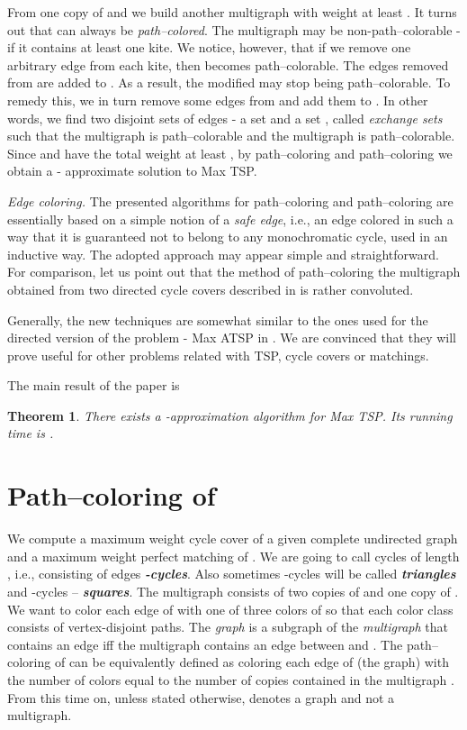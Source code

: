 \documentclass[a4, 11pt]{article}
\newcommand{\<}{\langle}
\renewcommand{\>}{\rangle}
\newtheorem{theorem}{Theorem}
\begin{document}
 From one copy of  and  we build another multigraph  with weight at least . It turns out that  can always be {\em path--colored}. The multigraph  may be non-path--colorable - if it contains at least one kite.  We notice, however, that if we remove one arbitrary edge from each kite, then  becomes path--colorable.  The edges removed from  are added to . As a result,
the modified  may stop being path--colorable. To remedy this, we in turn remove some edges from  and add them to .  In other words, we find  two disjoint sets of edges - a set  and a set , called {\em exchange sets} such that the multigraph  is path--colorable and the multigraph  is path--colorable. Since  and  have the total weight at least , by path--coloring  and path--coloring  we obtain a  - approximate solution to Max TSP.

{\em Edge coloring.} The presented algorithms for path--coloring and path--coloring are essentially based on a simple notion of a {\em safe edge}, i.e., 
an edge colored in such a way that it is guaranteed not to belong to any monochromatic cycle, used in an inductive way.  The adopted approach may appear simple and straightforward. For comparison, let us point out that the method of path--coloring the multigraph obtained from two directed cycle covers described in \cite{Svir} is rather convoluted.

Generally, the new techniques are somewhat similar to the ones used for the directed version of the problem - Max ATSP in \cite{Pal34}.
We are convinced that they will prove useful for other problems related with TSP, cycle covers or matchings.

The main result of the paper is
\begin{theorem}
There exists a -approximation algorithm for Max TSP. Its running time is .
\end{theorem}

\section{Path--coloring of }
We  compute a maximum weight cycle cover  of a given complete undirected graph  and a maximum weight perfect matching  of .
We are going to call cycles of length , i.e., consisting of  edges {\bf \em -cycles}. Also sometimes -cycles will be called {\bf \em triangles} and -cycles -- {\bf \em squares}.
The multigraph  consists of two copies of  and one copy of . We want to color each edge of  with one of three colors of   so that each color class consists of vertex-disjoint  paths. 
The {\em graph}  is a subgraph of the {\em multigraph}  that contains an edge   iff the multigraph  contains an edge between  and . The path--coloring of  can be equivalently defined as coloring each edge of (the graph)  with the number of colors equal to the number of copies contained in the multigraph . From this time on, unless stated otherwise,  denotes a graph
and not a multigraph.
\end{document}
